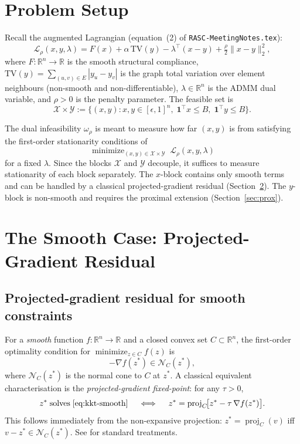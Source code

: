 \documentclass[11pt]{article}
\newcommand{\proj}{\operatorname{proj}}
\newcommand{\TV}{\mathrm{TV}}
\newcommand{\mini}{\mathop{\mathrm{minimize}}}
\newcommand{\R}{\mathbb{R}}
\theoremstyle{plain}
\theoremstyle{remark}
\begin{document}
\section{Problem Setup}

Recall the augmented Lagrangian (equation~(2) of \texttt{RASC-MeetingNotes.tex}):
\begin{equation}\label{eq:aug-lag}
  \mathcal{L}_\rho(x,y,\lambda)
  = F(x) + \alpha\,\TV(y)
    - \lambda^\top(x - y)
    + \tfrac{\rho}{2}\|x - y\|_2^2,
\end{equation}
where $F:\R^n\to\R$ is the smooth structural compliance, $\TV(y) =
\sum_{(u,v)\in E}|y_u - y_v|$ is the graph total variation over element
neighbours (non-smooth and non-differentiable), $\lambda\in\R^n$ is the ADMM
dual variable, and $\rho > 0$ is the penalty parameter.  The feasible set is
\[
  \mathcal{X} \times \mathcal{Y}
  := \bigl\{(x,y): x,y\in[\epsilon,1]^n,\;\mathbf{1}^\top x \leq B,\;
    \mathbf{1}^\top y \leq B\bigr\}.
\]

The dual infeasibility $\omega_\rho$ is meant to measure how far $(x,y)$
is from satisfying the first-order stationarity conditions of
\[
  \mini_{(x,y)\in\mathcal{X}\times\mathcal{Y}}\;
  \mathcal{L}_\rho(x,y,\lambda)
\]
for a fixed $\lambda$.  Since the blocks $\mathcal{X}$ and $\mathcal{Y}$
decouple, it suffices to measure stationarity of each block separately.
The $x$-block contains only smooth terms and can be handled by a classical
projected-gradient residual (Section~\ref{sec:smooth}).  The $y$-block is
non-smooth and requires the proximal extension (Section~\ref{sec:prox}).

\section{The Smooth Case: Projected-Gradient Residual}
\label{sec:smooth}

\subsection{Projected-gradient residual for smooth constraints}

For a \emph{smooth} function $f:\R^n\to\R$ and a closed convex set $C\subset\R^n$,
the first-order optimality condition for $\mini_{z\in C} f(z)$ is
\begin{equation}\label{eq:kkt-smooth}
  -\nabla f(z^*) \in \mathcal{N}_C(z^*),
\end{equation}
where $\mathcal{N}_C(z^*)$ is the normal cone to $C$ at $z^*$.  A classical
equivalent characterisation is the \emph{projected-gradient fixed-point}:
for any $\tau > 0$,
\begin{equation}\label{eq:proj-fp}
  z^* \;\text{solves}\;\eqref{eq:kkt-smooth}
  \quad\iff\quad
  z^* = \proj_C\!\bigl[z^* - \tau\,\nabla f(z^*)\bigr].
\end{equation}
This follows immediately from the non-expansive projection: $z^* = \proj_C(v)$
iff $v - z^* \in \mathcal{N}_C(z^*)$.  See \cite{ParBoy14,Bertsekas99} for
standard treatments.
\end{document}
